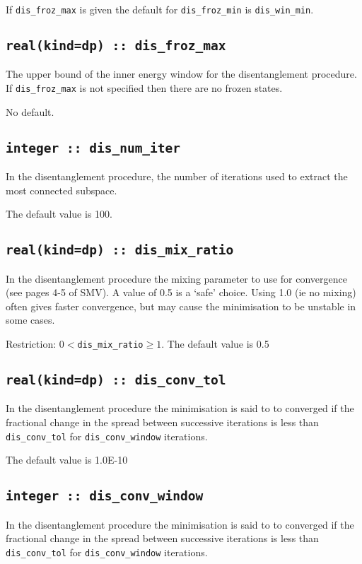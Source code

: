 If \verb#dis_froz_max# is given the default for 
\verb#dis_froz_min# is \verb#dis_win_min#.


\subsection[dis\_froz\_max]{\tt real(kind=dp) :: dis\_froz\_max}
The upper bound of the inner energy window for the disentanglement
procedure. If \verb#dis_froz_max# is  not specified then 
there are no frozen states.

No default.

\subsection[dis\_num\_iter]{\tt integer :: dis\_num\_iter}
In the disentanglement procedure, the
number of iterations used to extract the most connected subspace.

The default value is 100.

\subsection[dis\_mix\_ratio]{\tt real(kind=dp) :: dis\_mix\_ratio}
In the disentanglement procedure the mixing parameter to use for
convergence (see pages 4-5 of SMV). A value of 0.5 is a `safe'
choice. Using 1.0 (ie no mixing) often gives faster convergence, 
but may cause the minimisation to be unstable in some cases.


Restriction: $0<${\tt dis\_mix\_ratio}$\geq1$. The default value is 0.5 

\subsection[dis\_conv\_tol]{\tt real(kind=dp) :: dis\_conv\_tol}

In the disentanglement procedure the minimisation is said to to converged
if the fractional change in the spread between successive
iterations is less than
\verb#dis_conv_tol# for \verb#dis_conv_window# iterations.

The default value is 1.0E-10


\subsection[dis\_conv\_window]{\tt integer :: dis\_conv\_window}

In the disentanglement procedure the minimisation is said to to converged
if the fractional change in the spread between successive
iterations is less than
\verb#dis_conv_tol# for \verb#dis_conv_window# iterations.

